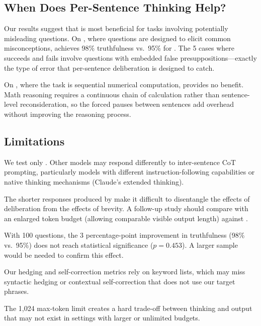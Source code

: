 \subsection{When Does Per-Sentence Thinking Help?}
\label{sec:when_helps}

Our results suggest that \iscotshort is most beneficial for tasks involving potentially misleading questions.
On \truthfulqa, where questions are designed to elicit common misconceptions, \iscotshort achieves 98\% truthfulness vs.\ 95\% for \standard.
The 5 cases where \iscotshort succeeds and \standard fails involve questions with embedded false presuppositions---exactly the type of error that per-sentence deliberation is designed to catch.

On \gsmk, where the task is sequential numerical computation, \iscotshort provides no benefit.
Math reasoning requires a continuous chain of calculation rather than sentence-level reconsideration, so the forced pauses between sentences add overhead without improving the reasoning process.

\subsection{Limitations}
\label{sec:limitations}

We test only \gptfour.
Other models may respond differently to inter-sentence CoT prompting, particularly models with different instruction-following capabilities or native thinking mechanisms (\eg Claude's extended thinking).

The shorter responses produced by \iscotshort make it difficult to disentangle the effects of deliberation from the effects of brevity.
A follow-up study should compare \iscotshort with an enlarged token budget (allowing comparable visible output length) against \standard.

With 100 \truthfulqa questions, the 3 percentage-point improvement in truthfulness (98\% vs.\ 95\%) does not reach statistical significance ($p = 0.453$).
A larger sample would be needed to confirm this effect.

Our hedging and self-correction metrics rely on keyword lists, which may miss syntactic hedging or contextual self-correction that does not use our target phrases.

The 1{,}024 max-token limit creates a hard trade-off between thinking and output that may not exist in settings with larger or unlimited budgets.
